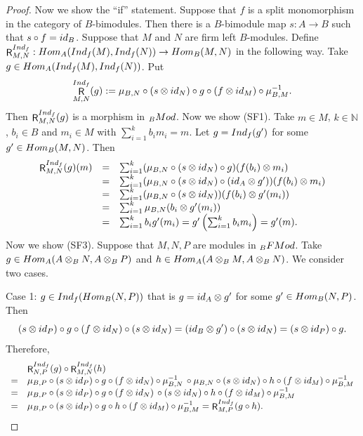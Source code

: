 \documentclass[10pt,a4paper]{amsart}
\newcommand{\FMod}{{\rm FMod}}
\newcommand{\Hom}{{\rm Hom}}
\newcommand{\Ind}{{\rm Ind}}
\newcommand{\Mod}{{\rm Mod}}
\newcommand{\N}{\mathbb{N}}
\DeclareMathOperator{\R}{\mathsf R}
\newcommand{\id}{{\rm id}}
\begin{document}
\begin{proof}
Now we show the ``if'' statement.
Suppose that $f$ is a split monomorphism in the 
category of $B$-bimodules. Then there is a 
$B$-bimodule map
$s : A \to B$ such that $s \circ f = \id_B$.
Suppose that $M$ and $N$ are firm left $B$-modules.
Define 
$\R_{M,N}^{\Ind_f} : 
\Hom_A(\Ind_f(M),\Ind_f(N)) \to 
\Hom_B(M,N)$
in the following way. 
Take 
$g \in \Hom_A(\Ind_f(M) , \Ind_f(N))$.
Put
\[
\R_{M,N}^{\Ind_f}(g) :=
\mu_{B,N} \circ (s \otimes \id_N) 
\circ g \circ 
(f \otimes \id_M) \circ \mu_{B,M}^{-1}.
\]
Then $\R_{M,N}^{\Ind_f}(g)$
is a morphism in ${}_B \Mod$.
Now we show (SF1).
Take $m \in M$,
$k \in \N$, $b_i \in B$ and $m_i \in M$
with $\sum_{i=1}^k b_i m_i = m$. 
Let $g = \Ind_f(g')$ for some 
$g' \in \Hom_B(M,N)$. Then 
\[
\begin{array}{rcl}
\R_{M,N}^{\Ind_f}(g)(m) 
&=& 
\sum_{i=1}^k (\mu_{B,N} \circ
(s \otimes \id_N) \circ g)
(f(b_i) \otimes m_i) \\
&=&
\sum_{i=1}^k
(\mu_{B,N} \circ (s \otimes \id_N)
\circ (\id_A \otimes g')) 
(f(b_i) \otimes m_i) \\ 
&=& 
\sum_{i=1}^k
(\mu_{B,N} \circ (s \otimes \id_N))
(f(b_i) \otimes g'(m_i)) \\ 
&=& 
\sum_{i=1}^k
\mu_{B,N} (b_i \otimes g'(m_i)) \\
&=& \sum_{i=1}^k b_i g'(m_i) 
= g' \left( \sum_{i=1}^k b_i m_i \right)
= g'(m).
\end{array}
\]
Now we show (SF3).
Suppose that $M,N,P$ are modules in ${}_B \FMod$. 
Take $g \in \Hom_A(A \otimes_B N,
A \otimes_B P)$ and 
$h \in \Hom_A(A \otimes_B M,
A \otimes_B N)$. 
We consider two cases.

Case 1: $g \in \Ind_f(\Hom_B(N,P))$
that is 
$g = \id_A \otimes g'$ for 
some $g' \in \Hom_B(N,P)$. Then
\[
(s \otimes \id_P) \circ g \circ 
(f \otimes \id_N) \circ 
(s \otimes \id_N) = 
(\id_B \otimes g') \circ 
(s \otimes \id_N) = 
(s \otimes \id_P) \circ g.
\]
Therefore,
{\small \[
\begin{array}{cl}
 & \R_{N,P}^{\Ind_f}(g) \circ
\R_{M,N}^{\Ind_f}(h) \\ 
= & \mu_{B,P} \circ (s \otimes \id_P)
\circ g \circ (f \otimes \id_N)
\circ \mu_{B,N}^{-1} \, \circ 
 \mu_{B,N} \circ (s \otimes \id_N)
\circ h \circ (f \otimes \id_M) 
\circ \mu_{B,M}^{-1} \\
=& \mu_{B,P} \circ (s \otimes \id_P)
\circ g \circ (f \otimes \id_N) \, \circ   
(s \otimes \id_N) \circ h \circ 
(f \otimes \id_M) \circ \mu_{B,M}^{-1} \\
=& \mu_{B,P} \circ (s \otimes \id_P) 
\circ g \circ h \circ 
(f \otimes \id_M) \circ \mu_{B,M}^{-1} 
= \R_{M,P}^{\Ind_f}(g \circ h).
\end{array}
\]}


\end{proof}
\end{document}
